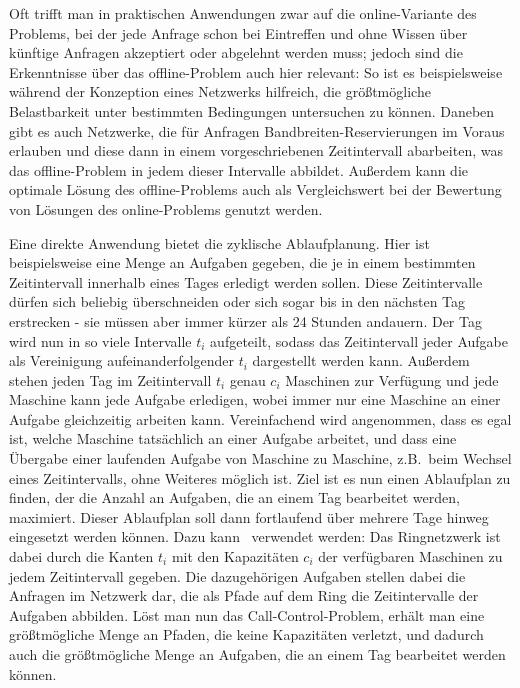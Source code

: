 Oft trifft man in praktischen Anwendungen zwar auf die online-Variante des Problems, bei der jede Anfrage schon bei Eintreffen und
ohne Wissen über künftige Anfragen akzeptiert oder abgelehnt werden muss;
jedoch sind die Erkenntnisse über das offline-Problem auch hier relevant:
So ist es beispielsweise während der Konzeption eines Netzwerks hilfreich, die größtmögliche Belastbarkeit unter bestimmten 
Bedingungen untersuchen zu können.
Daneben gibt es auch Netzwerke, die für Anfragen Bandbreiten-Reservierungen im Voraus erlauben und diese dann in einem 
vorgeschriebenen Zeitintervall abarbeiten, was das offline-Problem in jedem dieser Intervalle abbildet.
Außerdem kann die optimale Lösung des offline-Problems auch als Vergleichswert bei der Bewertung von Lösungen des
online-Problems genutzt werden.

Eine direkte Anwendung bietet die zyklische Ablaufplanung.
Hier ist beispielsweise eine Menge an Aufgaben gegeben, die je in einem bestimmten Zeitintervall innerhalb eines Tages erledigt werden sollen.
Diese Zeitintervalle dürfen sich beliebig überschneiden oder sich sogar bis in den nächsten Tag erstrecken - sie müssen aber immer kürzer 
als 24 Stunden andauern.
Der Tag wird nun in so viele Intervalle $t_i$ aufgeteilt, sodass das Zeitintervall jeder Aufgabe als Vereinigung  
aufeinanderfolgender $t_i$ dargestellt werden kann.
Außerdem stehen jeden Tag im Zeitintervall $t_i$ genau $c_i$ Maschinen zur Verfügung und jede Maschine kann jede Aufgabe erledigen, wobei immer nur 
eine Maschine an einer Aufgabe gleichzeitig arbeiten kann.
Vereinfachend wird angenommen, dass es egal ist, welche Maschine tatsächlich an einer Aufgabe arbeitet, und dass eine Übergabe einer laufenden
Aufgabe von Maschine zu Maschine, z.B.\ beim Wechsel eines Zeitintervalls, ohne Weiteres möglich ist.
Ziel ist es nun einen Ablaufplan zu finden, der die Anzahl an Aufgaben, die an einem Tag bearbeitet werden, maximiert.
Dieser Ablaufplan soll dann fortlaufend über mehrere Tage hinweg eingesetzt werden können.
Dazu kann \CallControl\ verwendet werden: Das Ringnetzwerk ist dabei durch die Kanten $t_i$ mit den Kapazitäten $c_i$ der verfügbaren Maschinen
zu jedem Zeitintervall gegeben. Die dazugehörigen Aufgaben stellen dabei die Anfragen im Netzwerk dar, die als Pfade auf dem Ring die Zeitintervalle
der Aufgaben abbilden.
Löst man nun das Call-Control-Problem, erhält man eine größtmögliche Menge an Pfaden, die keine Kapazitäten verletzt, und dadurch auch die
größtmögliche Menge an Aufgaben, die an einem Tag bearbeitet werden können.
